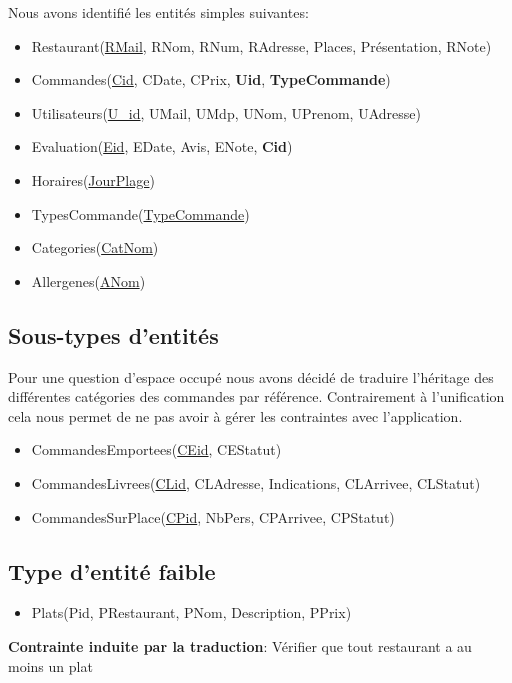 \documentclass[10pt, a4paper]{article}
\begin{document}
Nous avons identifié les entités simples suivantes:

\begin{itemize}
    \item Restaurant\@(\underline{RMail}, RNom, RNum, RAdresse, Places, Présentation, RNote)
    \item Commandes\@(\underline{Cid}, CDate, CPrix, \textbf{Uid}, \textbf{TypeCommande})
    \item Utilisateurs\@(\underline{U\_id}, UMail, UMdp, UNom, UPrenom, UAdresse)
    \item Evaluation\@(\underline{Eid}, EDate, Avis, ENote, \textbf{Cid})
    \item Horaires\@(\underline{JourPlage})
    \item TypesCommande\@(\underline{TypeCommande})
    \item Categories\@(\underline{CatNom})
    \item Allergenes\@(\underline{ANom})
\end{itemize}

\subsection{Sous-types d'entités}

Pour une question d'espace occupé nous avons décidé de traduire l'héritage des différentes catégories des commandes par référence. 
Contrairement à l'unification cela nous permet de ne pas avoir à gérer les contraintes avec l'application.

\begin{itemize}
    \item CommandesEmportees\@(\underline{CEid}, CEStatut)
    \item CommandesLivrees\@(\underline{CLid}, CLAdresse, Indications, CLArrivee, CLStatut)
    \item CommandesSurPlace\@(\underline{CPid}, NbPers, CPArrivee, CPStatut)
\end{itemize}

\subsection{Type d'entité faible}

\begin{itemize}
    \item Plats\@(Pid, PRestaurant, PNom, Description, PPrix)
\end{itemize}

\textbf{Contrainte induite par la traduction}: Vérifier que tout restaurant a au moins un plat 
\end{document}
